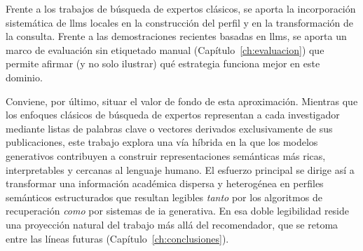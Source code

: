 Frente a los trabajos de búsqueda de expertos clásicos, se aporta la incorporación sistemática de \glspl{llm} locales en la construcción del perfil y en la transformación de la consulta.
Frente a las demostraciones recientes basadas en \glspl{llm}, se aporta un marco de evaluación sin etiquetado manual (Capítulo~\ref{ch:evaluacion}) que permite afirmar (y no solo ilustrar) qué estrategia funciona mejor en este dominio.

Conviene, por último, situar el valor de fondo de esta aproximación.
Mientras que los enfoques clásicos de búsqueda de expertos representan a cada investigador mediante listas de palabras clave o vectores derivados exclusivamente de sus publicaciones, este trabajo explora una vía híbrida en la que los modelos generativos contribuyen a construir representaciones semánticas más ricas, interpretables y cercanas al lenguaje humano.
El esfuerzo principal se dirige así a transformar una información académica dispersa y heterogénea en perfiles semánticos estructurados que resultan legibles \emph{tanto} por los algoritmos de recuperación \emph{como} por sistemas de \gls{ia} generativa.
En esa doble legibilidad reside una proyección natural del trabajo más allá del recomendador, que se retoma entre las líneas futuras (Capítulo~\ref{ch:conclusiones}).
